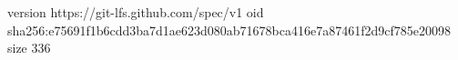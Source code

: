 version https://git-lfs.github.com/spec/v1
oid sha256:e75691f1b6cdd3ba7d1ae623d080ab71678bca416e7a87461f2d9cf785e20098
size 336
